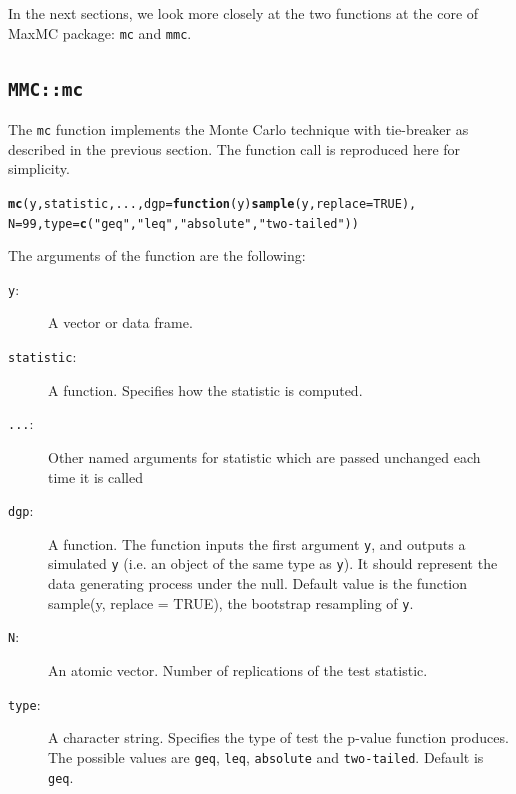 \documentclass[]{article}\usepackage[]{graphicx}\usepackage[]{color}
\makeatletter
\newcommand{\hlnum}[1]{\textcolor[rgb]{0.686,0.059,0.569}{#1}}%
\newcommand{\hlstr}[1]{\textcolor[rgb]{0.192,0.494,0.8}{#1}}%
\newcommand{\hlstd}[1]{\textcolor[rgb]{0.345,0.345,0.345}{#1}}%
\newcommand{\hlkwa}[1]{\textcolor[rgb]{0.161,0.373,0.58}{\textbf{#1}}}%
\newcommand{\hlkwc}[1]{\textcolor[rgb]{0.333,0.667,0.333}{#1}}%
\newcommand{\hlkwd}[1]{\textcolor[rgb]{0.737,0.353,0.396}{\textbf{#1}}}%
\newenvironment{kframe}{%
 \def\at@end@of@kframe{}%
 \ifinner\ifhmode%
  \def\at@end@of@kframe{\end{minipage}}%
  \begin{minipage}{\columnwidth}%
 \fi\fi%
 \def\FrameCommand##1{\hskip\@totalleftmargin \hskip-\fboxsep
 \colorbox{shadecolor}{##1}\hskip-\fboxsep
     \hskip-\linewidth \hskip-\@totalleftmargin \hskip\columnwidth}%
 \MakeFramed {\advance\hsize-\width
   \@totalleftmargin\z@ \linewidth\hsize
   \@setminipage}}%
 {\par\unskip\endMakeFramed%
 \at@end@of@kframe}
\newenvironment{knitrout}{}{} %
\newcommand{\pkg}[1]{{\normalfont\fontseries{b}\selectfont #1}}
\let\code=\texttt
\makeatother
\begin{document}
In the next sections, we look more closely at the two functions at the core of \pkg{MaxMC} package: \code{mc} and \code{mmc}.

\subsection{\code{MMC::mc}}

The \code{mc} function implements the Monte Carlo technique with tie-breaker as described in the previous section.
The function call is reproduced here for simplicity.
\begin{knitrout}
\color{fgcolor}\begin{kframe}
\begin{alltt}
\hlkwd{mc}\hlstd{(y, statistic, ...,} \hlkwc{dgp} \hlstd{=} \hlkwa{function}\hlstd{(}\hlkwc{y}\hlstd{)} \hlkwd{sample}\hlstd{(y,} \hlkwc{replace} \hlstd{=} \hlnum{TRUE}\hlstd{),}
    \hlkwc{N} \hlstd{=} \hlnum{99}\hlstd{,} \hlkwc{type} \hlstd{=} \hlkwd{c}\hlstd{(}\hlstr{"geq"}\hlstd{,} \hlstr{"leq"}\hlstd{,} \hlstr{"absolute"}\hlstd{,} \hlstr{"two-tailed"}\hlstd{))}
\end{alltt}
\end{kframe}
\end{knitrout}

The arguments of the function are the following:
\begin{description}
	\item[\code{y}:] A vector or data frame.

	\item[\code{statistic}:] A function. Specifies how the statistic is computed.

	\item[\code{...}:] Other named arguments for statistic which are passed unchanged each time it is
		called

	\item[\code{dgp}:] A function. The function inputs the first argument \code{y}, and outputs a simulated \code{y} (i.e. an object of the same type as \code{y}). It should represent the data generating process under the null. Default value is the function sample(y, replace = TRUE), the bootstrap resampling of \code{y}.

	\item[\code{N}:] An atomic vector. Number of replications of the test statistic.

	\item[\code{type}:] A character string. Specifies the type of test the p-value function produces. The possible values are \code{geq}, \code{leq}, \code{absolute} and \code{two-tailed}. Default is \code{geq}.
\end{description}
\end{document}
